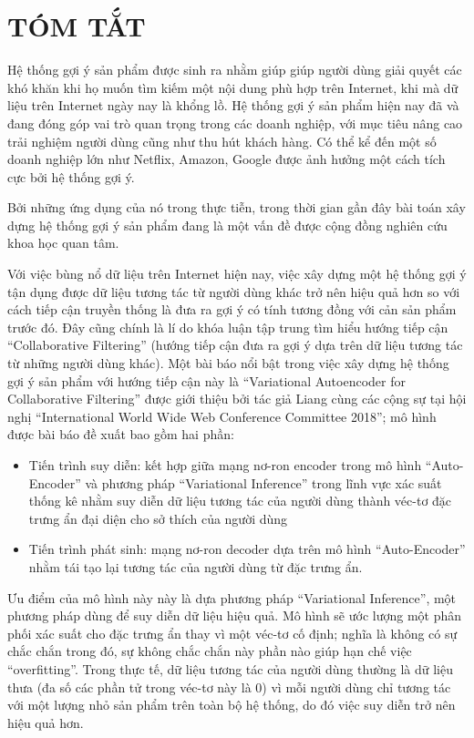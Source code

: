 
\chapter*{TÓM TẮT}
\label{tomtat}

Hệ thống gợi ý sản phẩm được sinh ra nhằm giúp giúp người dùng giải quyết các khó khăn khi họ muốn tìm kiếm một nội dung phù hợp trên Internet, khi mà dữ liệu trên Internet ngày nay là khổng lồ. Hệ thống gợi ý sản phẩm hiện nay đã và đang đóng góp vai trò quan trọng trong các doanh nghiệp, với mục tiêu nâng cao trải nghiệm người dùng cũng như thu hút khách hàng. Có thể kể đến một số doanh nghiệp lớn như Netflix, Amazon, Google được ảnh hưởng một cách tích cực bởi hệ thống gợi ý.

Bởi những ứng dụng của nó trong thực tiễn, trong thời gian gần đây bài toán xây dựng hệ thống gợi ý sản phẩm đang là một vấn đề được cộng đồng nghiên cứu khoa học quan tâm. 

Với việc bùng nổ dữ liệu trên Internet hiện nay, việc xây dựng một hệ thống gợi ý tận dụng được dữ liệu tương tác từ người dùng khác trở nên hiệu quả hơn so với cách tiếp cận truyền thống là đưa ra gợi ý có tính tương đồng với cản sản phẩm trước đó. Đây cũng chính là lí do khóa luận tập trung tìm hiểu hướng tiếp cận ``Collaborative Filtering'' (hướng tiếp cận đưa ra gợi ý dựa trên dữ liệu tương tác từ những người dùng khác). Một bài báo nổi bật trong việc xây dựng hệ thống gợi ý sản phẩm với hướng tiếp cận này là ``Variational Autoencoder for Collaborative Filtering'' \cite{mvae} được giới thiệu bởi tác giả Liang cùng các cộng sự tại hội nghị ``International World Wide Web Conference Committee 2018''; mô hình được bài báo đề xuất bao gồm hai phần:
\begin{itemize}
    \item Tiến trình suy diễn: kết hợp giữa mạng nơ-ron encoder trong mô hình ``Auto-Encoder'' và phương pháp ``Variational Inference'' trong lĩnh vực xác suất thống kê nhằm suy diễn dữ liệu tương tác của người dùng thành véc-tơ đặc trưng ẩn đại diện cho sở thích của người dùng
    \item Tiến trình phát sinh: mạng nơ-ron decoder dựa trên mô hình ``Auto-Encoder'' nhằm tái tạo lại tương tác của người dùng từ đặc trưng ẩn.
\end{itemize}

Ưu điểm của mô hình này này là dựa phương pháp ``Variational Inference'', một phương pháp dùng để suy diễn dữ liệu hiệu quả. Mô hình sẽ ước lượng một phân phối xác suất cho đặc trưng ẩn thay vì một véc-tơ cố định; nghĩa là không có sự chắc chắn trong đó, sự không chắc chắn này phần nào giúp hạn chế việc ``overfitting''. Trong thực tế, dữ liệu tương tác của người dùng thường là dữ liệu thưa (đa số các phần tử trong véc-tơ này là 0) vì mỗi người dùng chỉ tương tác với một lượng nhỏ sản phẩm trên toàn bộ hệ thống, do đó việc suy diễn trở nên hiệu quả hơn. 

